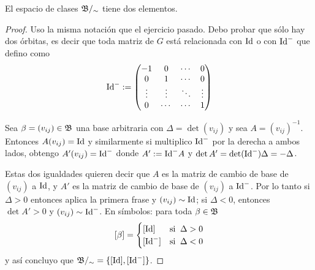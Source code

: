 \begin{ejercicio}\label{ej:25}
  El espacio de clases $\mathfrak{B}/_{\sim}$ tiene dos elementos.
\end{ejercicio}
\begin{proof}%
  Uso la misma notaci\'on que el ejercicio pasado. Debo probar que s\'olo hay dos \'orbitas,
  es decir que toda matriz de $G$ est\'a relacionada con $\text{Id}$ o con $\text{Id}^-$ que defino como
  \[
    \text{Id}^-:=\begin{pmatrix}
      -1 & 0 & \cdots & 0 \\
      0 & 1 & \cdots & 0 \\
        \vdots & \vdots & \ddots & \vdots \\
        0 & \cdots & \cdots & 1
    \end{pmatrix}
  \]
  
  Sea $\beta=(v_{ij})\in\mathfrak{B}$  una base arbitraria con $\Delta=\det(v_{ij})$ y sea $A=(v_{ij})^{-1}$.
  Entonces $A(v_{ij})=\text{Id}$ y similarmente si multiplico $\text{Id}^-$ por la derecha a ambos lados,
  obtengo $A'(v_{ij})=\text{Id}^-$ donde $A':=\text{Id}^-A$ y $\det A'=\det(\text{Id}^-)\Delta=-\Delta$.

  Estas dos igualdades quieren decir que $A$ es la matriz de cambio de base de $(v_{ij})$ a $\text{Id}$,
  y $A'$ es la matriz de cambio de base de $(v_{ij})$ a $\text{Id}^-$. Por lo tanto si $\Delta>0$ entonces
  aplica la primera frase y $(v_{ij})\sim\text{Id}$; si $\Delta<0$, entonces $\det A'>0$ y
  $(v_{ij})\sim\text{Id}^-$. En s\'imbolos: para toda $\beta\in\mathfrak{B}$
  \[
      [\beta]=
      \begin{cases}
        [\Id] &\text{si}\;\; \Delta>0 \\
        [\Id^-] & \text{si}\;\; \Delta<0
      \end{cases}
  \]
  y as\'i concluyo que $\mathfrak{B}/_{\sim}=\{[\text{Id}],[\text{Id}^-]\}$.
\end{proof}%

